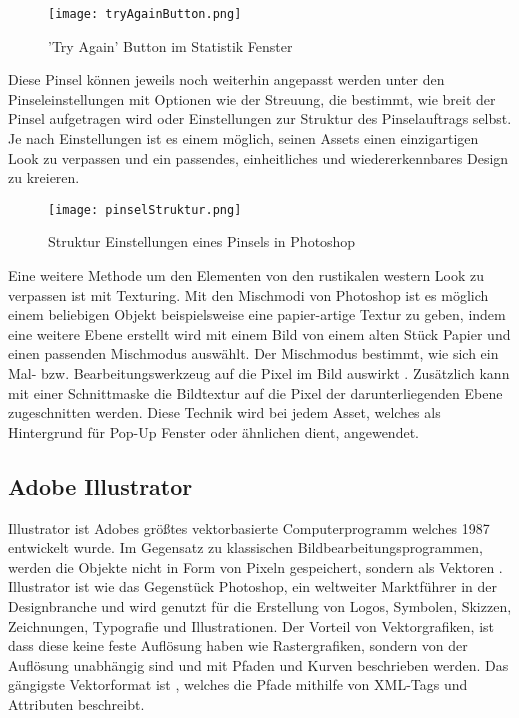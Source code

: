 \begin{figure}[H]
    \centering
    \texttt{[image: tryAgainButton.png]}
    \caption{'Try Again' Button im Statistik Fenster}
\end{figure}

Diese Pinsel können jeweils noch weiterhin angepasst werden unter den Pinseleinstellungen mit Optionen wie der Streuung, die bestimmt, wie breit der Pinsel aufgetragen wird oder Einstellungen zur Struktur des Pinselauftrags selbst. Je nach Einstellungen ist es einem möglich, seinen Assets einen einzigartigen Look zu verpassen und ein passendes, einheitliches und wiedererkennbares Design zu kreieren.

\begin{figure}[H]
    \centering
    \texttt{[image: pinselStruktur.png]}
    \caption{Struktur Einstellungen eines Pinsels in Photoshop} 
\end{figure}

Eine weitere Methode um den Elementen von \FF den rustikalen western Look zu verpassen ist mit Texturing. Mit den
Mischmodi von Photoshop ist es möglich einem beliebigen Objekt beispielsweise eine papier-artige Textur zu geben,
indem eine weitere Ebene erstellt wird mit einem Bild von einem alten Stück Papier und einen passenden Mischmodus
auswählt. Der Mischmodus bestimmt, wie sich ein Mal- bzw. Bearbeitungswerkzeug auf die Pixel im Bild auswirkt . Zusätzlich kann mit einer Schnittmaske die Bildtextur auf die Pixel der darunterliegenden Ebene
zugeschnitten werden. Diese Technik wird bei jedem Asset, welches als Hintergrund für Pop-Up Fenster oder ähnlichen dient, angewendet.

\subsection{Adobe Illustrator}

Illustrator ist Adobes größtes vektorbasierte Computerprogramm welches 1987 entwickelt wurde. Im Gegensatz zu
klassischen Bildbearbeitungsprogrammen, werden die Objekte nicht in Form von Pixeln gespeichert, sondern als Vektoren
. Illustrator ist wie das Gegenstück Photoshop, ein weltweiter Marktführer in der Designbranche und wird genutzt für
die Erstellung von Logos, Symbolen, Skizzen, Zeichnungen, Typografie und Illustrationen.  Der Vorteil
von Vektorgrafiken, ist dass diese keine feste Auflösung haben wie Rastergrafiken, sondern von der Auflösung unabhängig sind und mit Pfaden und Kurven beschrieben werden. Das gängigste Vektorformat ist
,
welches die Pfade mithilfe von XML-Tags und Attributen beschreibt.

